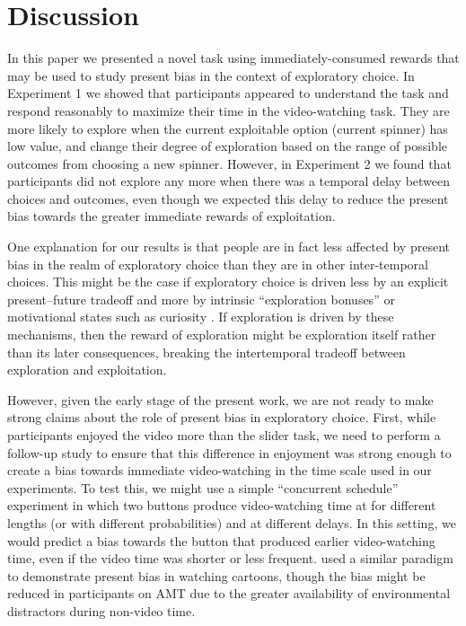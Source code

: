 \documentclass[10pt,letterpaper]{article}
\begin{document}
\section{Discussion}

In this paper we presented a novel task using immediately-consumed rewards that
may be used to study present bias in the context of exploratory choice. In
Experiment 1 we showed that participants appeared to understand the task and
respond reasonably to maximize their time in the video-watching task. They are
more likely to explore when the current exploitable option (current spinner) has
low value, and change their degree of exploration based on the range of possible
outcomes from choosing a new spinner. However, in Experiment 2 we found that
participants did not explore any more when there was a temporal delay between
choices and outcomes, even though we expected this delay to reduce the present
bias towards the greater immediate rewards of exploitation.

One explanation for our results is that people are in fact less affected by
present bias in the realm of exploratory choice than they are in other
inter-temporal choices. This might be the case if exploratory choice is driven
less by an explicit present--future tradeoff and more by intrinsic ``exploration
bonuses'' \citep{kakade2002dopamine} or motivational states such as curiosity
\citep{Berlyne1966}. If exploration is driven by these mechanisms, then the
reward of exploration might be exploration itself rather than its later
consequences, breaking the intertemporal tradeoff between exploration and
exploitation.

However, given the early stage of the present work, we are not ready to make
strong claims about the role of present bias in exploratory choice. First, while
participants enjoyed the video more than the slider task, we need to perform a
follow-up study to ensure that this difference in enjoyment was strong enough to
create a bias towards immediate video-watching in the time scale used in our
experiments. To test this, we might use a simple ``concurrent schedule''
experiment in which two buttons produce video-watching time at for different
lengths (or with different probabilities) and at different delays. In this
setting, we would predict a bias towards the button that produced earlier
video-watching time, even if the video time was shorter or less frequent.
\citet{Navarick1998} used a similar paradigm to demonstrate present bias in
watching cartoons, though the bias might be reduced in participants on AMT due
to the greater availability of environmental distractors during non-video time.
\end{document}
